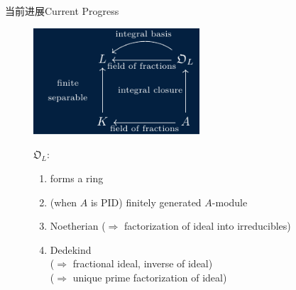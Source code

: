 \documentclass[aspectratio=169]{beamer}
\begin{document}
    \begin{frame}{当前进展}{Current Progress}
        \begin{figure}[htpb]
        \centering
        \begin{minipage}{0.49\linewidth}
        \includegraphics[width=6.2cm]{dia5.pdf}
        \end{minipage}
        \hfill
        \begin{minipage}{0.49\linewidth}
        $\mathfrak{O}_L$:
        \begin{enumerate}
        \item forms a ring
        \item (when $A$ is PID) finitely generated $A$-module
        \item Noetherian ($\Rightarrow$ factorization of ideal into irreducibles)
        \item \textcolor{rgb,255:red,214;green,214;blue,92}{Dedekind 
        \\ ($\Rightarrow$ fractional ideal, inverse of ideal)
        \\ ($\Rightarrow$ unique prime factorization of ideal)}
        \end{enumerate}
        \end{minipage}
        \end{figure}
    \end{frame}
    
\end{document}
